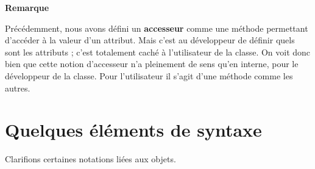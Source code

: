 	\textbf{Remarque}
	
	Précédemment, nous avons défini un \textbf{accesseur} comme une méthode
	permettant d’accéder à la valeur d’un attribut. Mais c’est au
	développeur de définir quels sont les attributs ; c’est totalement caché
	à l’utilisateur de la classe. On voit donc bien que cette notion
	d’accesseur n’a pleinement de sens qu’en interne, pour le développeur
	de la classe. Pour l’utilisateur il s’agit d’une méthode comme les
	autres.

\section{Quelques éléments de syntaxe}

	Clarifions certaines notations liées aux objets.

